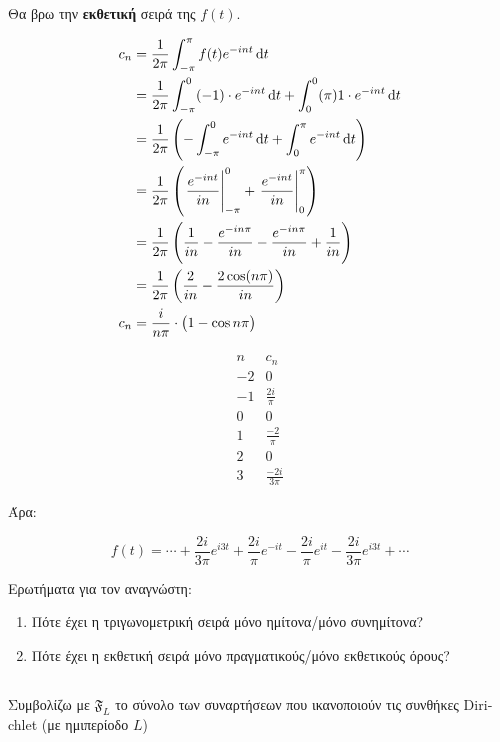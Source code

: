 \documentclass[11pt,a4paper,titlepage,final]{article}
\begin{document}
Θα βρω την \textbf{εκθετική} σειρά της \(f(t)\).

\begin{align*}
c_n &= \frac{1}{2\pi}
\int_{-\pi}^\pi f(t)e^{-int}\dif t \\
&=
\frac{1}{2\pi}
\int_{-\pi}^0(-1)\cdot e^{-int} \dif t
+
\int_{0}^0(\pi)1\cdot e^{-int} \dif t
\\ &=
\frac{1}{2\pi}
\left(
- \int_{-\pi}^0e^{-int}\dif t
+ \int_0^\pi e^{-int} \dif t
\right)
\\ &=
\frac{1}{2\pi}
\left(
 \left. \frac{e^{-int}}{in} \right|_{-\pi}^0
+ \left. \frac{e^{-int}}{in} \right|_0^\pi
\right)
\\ &=
\frac{1}{2\pi} \left(
\frac{1}{in} - \frac{e^{-in\pi}}{in} - \frac{e^{-in\pi}}{in} + \frac{1}{in}
\right)
\\ &=
\frac{1}{2\pi}
\left(
\frac{2}{in}
- \frac{2\cos (n \pi)}{in}
\right)
\\ c_n &=
\frac{i}{n\pi}
\cdot \big(
1-\cos n\pi
\big)
\end{align*}

\[
\begin{array}{r|l}
n & c_n \\
-2 & 0 \\
-1 & \frac{2i}{\pi} \\
0 & 0 \\
1 & \frac{-2}{\pi} \\
2 & 0 \\
3 & \frac{-2i}{3\pi}
\end{array}
\]

Άρα:

\[
f(t) = \cdots + \frac{2i}{3\pi} e^{i3t} + \frac{2i}{\pi} e^{-it}
- \frac{2i}{\pi} e^{it}
- \frac{2i}{3\pi} e^{i3t} + \cdots
\]

Ερωτήματα για τον αναγνώστη:
\begin{enumerate}
\item
Πότε έχει η τριγωνομετρική σειρά μόνο ημίτονα/μόνο συνημίτονα?
\item
Πότε έχει η εκθετική σειρά μόνο πραγματικούς/μόνο εκθετικούς όρους?
\end{enumerate}

\subsection{}
\begin{defn*}{}
Συμβολίζω με \(\mathfrak{F}_L\) το σύνολο των συναρτήσεων που ικανοποιούν τις συνθήκες \textlatin{Dirichlet} (με ημιπερίοδο \(L\))
\end{defn*}
\end{document}
